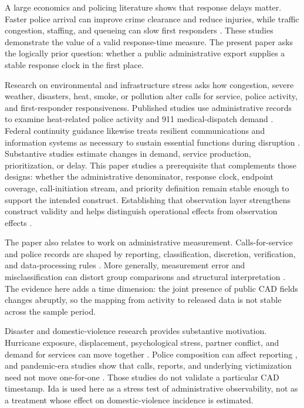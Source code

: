 \documentclass[11pt]{article}
\begin{document}
A large economics and policing literature shows that response delays matter. Faster police arrival can improve crime clearance and reduce injuries, while traffic congestion, staffing, and queueing can slow first responders \citep{BlanesKirchmaier2018,DeAngeloTogerWeisburd2023,BrentBeland2020,MourtgosAdamsNix2024}. These studies demonstrate the value of a valid response-time measure. The present paper asks the logically prior question: whether a public administrative export supplies a stable response clock in the first place.

Research on environmental and infrastructure stress asks how congestion, severe weather, disasters, heat, smoke, or pollution alter calls for service, police activity, and first-responder responsiveness. Published studies use administrative records to examine heat-related police activity and 911 medical-dispatch demand \citep{BehrerBolotnyy2024,BassilEtAl2008}. Federal continuity guidance likewise treats resilient communications and information systems as necessary to sustain essential functions during disruption \citep{FEMA2024Continuity}. Substantive studies estimate changes in demand, service production, prioritization, or delay. This paper studies a prerequisite that complements those designs: whether the administrative denominator, response clock, endpoint coverage, call-initiation stream, and priority definition remain stable enough to support the intended construct. Establishing that observation layer strengthens construct validity and helps distinguish operational effects from observation effects \citep{BrentBeland2020,AnastarioShehabLawry2009,HarvilleTaylorTesfai2011}.

The paper also relates to work on administrative measurement. Calls-for-service and police records are shaped by reporting, classification, discretion, verification, and data-processing rules \citep{KlingerBridges1997,BoivinCordeau2011,BoivinOuellet2014,SimpsonOrosco2021}. More generally, measurement error and misclassification can distort group comparisons and structural interpretation \citep{KapteynYpma2007,ChenHongNekipelov2011,KnoxLoweMummolo2020}. The evidence here adds a time dimension: the joint presence of public CAD fields changes abruptly, so the mapping from activity to released data is not stable across the sample period.

Disaster and domestic-violence research provides substantive motivation. Hurricane exposure, displacement, psychological stress, partner conflict, and demand for services can move together \citep{AnastarioShehabLawry2009,SchumacherEtAl2010,HarvilleTaylorTesfai2011,FirstEtAl2022}. Police composition can affect reporting \citep{MillerSegal2019}, and pandemic-era studies show that calls, reports, and underlying victimization need not move one-for-one \citep{LeslieWilson2020,BullingerCarrPackham2021,MillerSegalSpencer2022,MillerSegalSpencer2024}. Those studies do not validate a particular CAD timestamp. Ida is used here as a stress test of administrative observability, not as a treatment whose effect on domestic-violence incidence is estimated.
\end{document}
